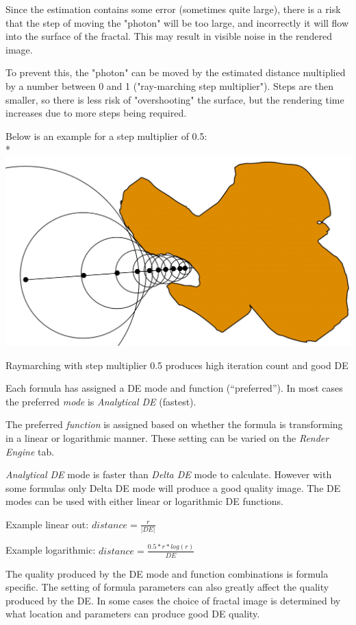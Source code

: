 Since the estimation contains some error (sometimes quite large), there is a
risk that the step of moving the "photon" will be too large, and incorrectly it
will flow into the surface of the fractal. This may result in visible noise in
the rendered image.

To prevent this, the "photon" can be moved by the estimated distance multiplied
by a number between 0 and 1 ("ray-marching step multiplier"). Steps are then
smaller, so there is less risk of "overshooting" the surface, but the rendering
time increases due to more steps being required.

Below is an example for a step multiplier of 0.5:\\*
\includegraphics[width=0.7\linewidth]{img/manual/media/distance_estimation_defactor_05}

Raymarching with step multiplier 0.5 produces high iteration count and good DE

Each formula has assigned a DE mode and function (``preferred''). In most cases
the preferred \emph{mode} is \emph{Analytical DE} (fastest).

The preferred \emph{function} is assigned based on whether the formula is
transforming in a linear or logarithmic manner. These setting can be varied on
the \emph{Render Engine} tab.

\emph{Analytical DE} mode is faster than \emph{Delta DE} mode to calculate.
However with some formulas only Delta DE mode will produce a good quality image.
The DE modes can be used with either linear or logarithmic DE functions.

Example linear out: $ distance = \frac{r}{\lvert DE \rvert} $

Example logarithmic: $ distance = \frac{0.5 * r * log(r)}{DE} $

The quality produced by the DE mode and function combinations is formula
specific. The setting of formula parameters can also greatly affect the quality
produced by the DE. In some cases the choice of fractal image is determined by
what location and parameters can produce good DE quality.

